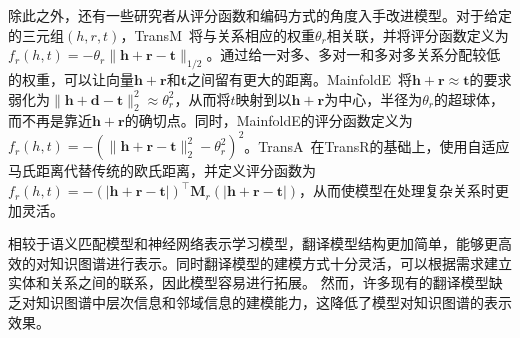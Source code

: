 \documentclass[algorithmlist, AutoFakeBold, AutoFakeSlant, figurelist, tablelist, nomlist, engineering, openany]{seuthesix} %
\begin{document}

除此之外，还有一些研究者从评分函数和编码方式的角度入手改进模型。对于给定的三元组$(h, r, t)$，TransM~\cite{fan2014transition}将与关系相应的权重$\theta_r$相关联，并将评分函数定义为$f_r(h, t)=-\theta_r\|\bm{h} + \bm{r} - \bm{t}\|_{1 / 2}$。通过给一对多、多对一和多对多关系分配较低的权重，可以让向量$\bm{h} + \bm{r}$和$\bm{t}$之间留有更大的距离。MainfoldE~\cite{xiao2016one}将$\bm{h} + \bm{r} \approx \bm{t}$的要求弱化为$\|\bm{h} + \bm{d} - \bm{t}\|_2^2 \approx \theta_r^2$，从而将$t$映射到以$\bm{h} + \bm{r}$为中心，半径为$\theta_r$的超球体，而不再是靠近$\bm{h} + \bm{r}$的确切点。同时，MainfoldE的评分函数定义为$f_r(h, t) = -\left(\|\bm{h} + \bm{r} - \bm{t}\|_2^2 - \theta_r^2\right)^2$。TransA~\cite{xiao2015transa}在TransR的基础上，使用自适应马氏距离代替传统的欧氏距离，并定义评分函数为$f_r(h, t) = -(|\bm{h} + \bm{r} - \bm{t}|)^{\top} \mathbf{M}_r(|\bm{h} + \bm{r} - \bm{t}|)$，从而使模型在处理复杂关系时更加灵活。

相较于语义匹配模型和神经网络表示学习模型，翻译模型结构更加简单，能够更高效的对知识图谱进行表示。同时翻译模型的建模方式十分灵活，可以根据需求建立实体和关系之间的联系，因此模型容易进行拓展。
然而，许多现有的翻译模型缺乏对知识图谱中层次信息和邻域信息的建模能力，这降低了模型对知识图谱的表示效果。
\end{document}
